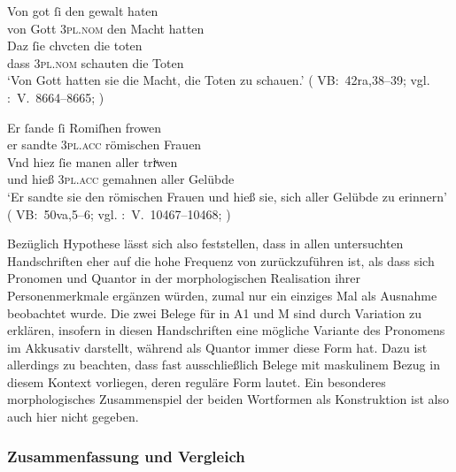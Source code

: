 \begin{exe}
\ex \label{ex:vbsisie}
 	\begin{xlist}
 	\ex \gll Von got ſi den gewalt haten \\
		     von Gott \textsc{3pl\subM.nom} den Macht hatten \\
 	\sn \gll Daz ſie chvcten die toten \\
		     dass \textsc{3pl\subM.nom} schauten die Toten \\
		\trans `Von Gott hatten sie  die Macht, die
			Toten zu schauen.'
			(%
				VB:~42ra,38--39; vgl.
				\KC:~V.~8664--8665;
				\cite[241]{schroeder1895}%
			)
 		\label{ex:vbsisie_1}

	\ex \gll Er ſande ſi Romiſhen frowen \\
		     er sandte \textsc{3pl\subI.acc} römischen Frauen \\
	\sn \gll Vnd hiez ſie manen aller triͮwen \\
		     und hieß \textsc{3pl\subF.acc} gemahnen aller Gelübde \\
		\trans `Er sandte sie  den römischen Frauen und
			hieß sie, sich aller Gelübde zu erinnern'
			(%
				VB:~50va,5--6; vgl.
				\KC:~V.~10467--10468;
				\cite[273]{schroeder1895}%
			)
		\label{ex:vbsisie_2}
	\end{xlist}%
\end{exe}

Bezüglich  Hypothese lässt sich also feststellen, dass
 in allen unter\-suchten Handschriften eher auf die hohe Frequenz
von  zurückzuführen ist, als dass sich Pro\-nomen und Quantor in der
morphologischen Realisation ihrer Personenmerkmale ergänzen würden, zumal
 nur ein einziges Mal als Ausnahme beobachtet wurde. Die zwei
Belege für  in A1 und M sind durch
Variation zu erklären, insofern  in diesen Handschriften eine
mög\-liche Variante des Pronomens im Akkusativ darstellt, während 
als Quantor immer diese Form hat. Dazu ist allerdings zu beachten, dass fast
ausschließlich Belege mit maskulinem Bezug in diesem Kontext vorliegen, deren
reguläre Form  lautet. Ein besonderes morphologisches Zusammenspiel
der beiden Wortformen als Konstruktion ist also auch hier nicht gegeben.

\subsubsection{Zusammenfassung und Vergleich}
\label{subsubsec:persfeatsmry}


